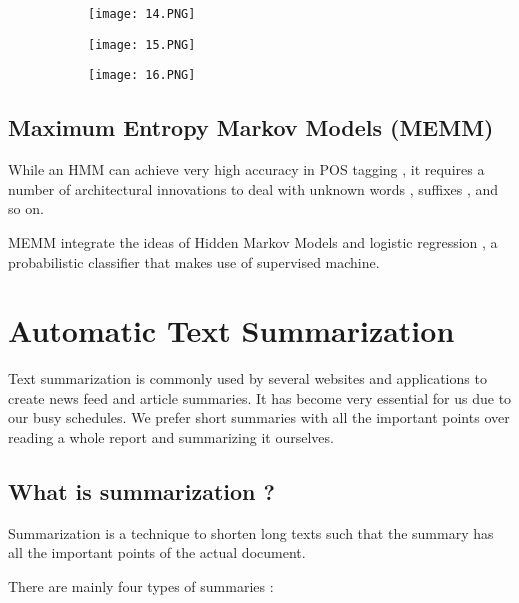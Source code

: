 \documentclass{article}
\begin{document}
\begin{figure}[ht!]
  \centering
  \begin{subfigure}[b]{0.5\linewidth}
    \texttt{[image: 14.PNG]}
  \end{subfigure}
     \begin{subfigure}[b]{0.49\textwidth}
         \centering
         \texttt{[image: 15.PNG]}
     \end{subfigure}
\end{figure}


\begin{figure}[ht!]
  \centering
  \begin{subfigure}[b]{0.9\linewidth}
    \texttt{[image: 16.PNG]}
  \end{subfigure}
\end{figure}

\subsection{Maximum Entropy Markov Models (MEMM)}

While an HMM can achieve very high accuracy in POS tagging , it requires a number of architectural innovations to deal with unknown words , suffixes , and so on.

MEMM integrate the ideas of Hidden Markov Models and logistic regression , a probabilistic classifier that makes use of supervised machine.

\section{Automatic Text Summarization}

Text summarization is commonly used by several websites and applications to create news feed and article summaries.
It has become very essential for us due to our busy schedules.
We prefer short summaries with all the important points over reading a whole report and summarizing it ourselves.

\subsection{What is summarization ?}

Summarization is a technique to shorten long texts such that the summary has all the important points of the actual document.

There are mainly four types of summaries : 
\end{document}
